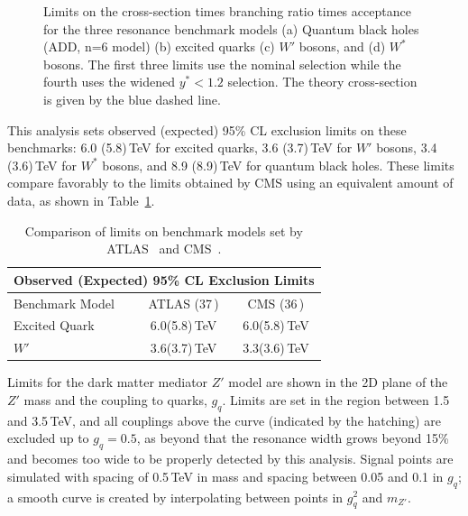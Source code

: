 \begin{figure}[ht!]
	\hspace{0.1\columnwidth}%
	\caption{Limits on the cross-section times branching ratio times acceptance for the three resonance benchmark models (a) Quantum black holes (ADD, n=6 model) (b) excited quarks (c) $W'$ bosons, and (d) $W^*$ bosons.  The first three limits use the nominal selection while the fourth uses the widened $y^* < 1.2$ selection.  The theory cross-section is given by the blue dashed line.}
	\label{fig:Limits}
\end{figure}

This analysis sets observed (expected) 95\% CL exclusion limits on these benchmarks: 6.0 (5.8)\,TeV for excited quarks, 3.6 (3.7)\,TeV for $W'$ bosons, 3.4 (3.6)\,TeV for $W^*$ bosons, and 8.9 (8.9)\,TeV for quantum black holes.  These limits compare favorably to the limits obtained by CMS using an equivalent amount of data, as shown in Table~\ref{tab:LimitCompare}.


\begin{table}[]
	\centering
	\begin{tabular}{l c c}
		\toprule
		\multicolumn{3}{c}{Observed (Expected) 95\% CL Exclusion Limits} \\
		\midrule
		Benchmark Model & ATLAS (37\,\ifb) & CMS (36\,\ifb)  \\
		\midrule
		Excited Quark & 6.0(5.8)\,TeV & 6.0(5.8)\,TeV\\
		\midrule
		$W'$ & 3.6(3.7)\,TeV & 3.3(3.6)\,TeV \\
		\bottomrule

	\end{tabular}
	\caption{Comparison of limits on benchmark models set by ATLAS~\cite{Dijet2017} and CMS~\cite{CMSDijet}.}
	\label{tab:LimitCompare}
\end{table} 

Limits for the dark matter mediator $Z'$ model are shown in the 2D plane of the $Z'$ mass and the coupling to quarks, $g_q$.  Limits are set in the region between 1.5 and 3.5\,TeV, and all couplings above the curve (indicated by the hatching) are excluded up to $g_q=0.5$, as beyond that the resonance width grows beyond 15\% and becomes too wide to be properly detected by this analysis.  Signal points are simulated with spacing of 0.5\,TeV in mass and spacing between 0.05 and 0.1 in $g_q$; a smooth curve is created by interpolating between points in $g_q^2$ and $m_{Z'}$.

